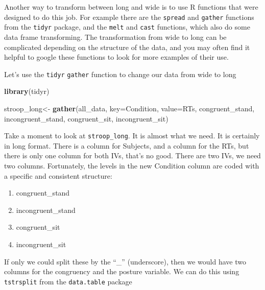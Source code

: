 \documentclass[
]{book}
\newenvironment{Shaded}{\begin{snugshade}}{\end{snugshade}}
\newcommand{\AttributeTok}[1]{\textcolor[rgb]{0.13,0.29,0.53}{#1}}
\newcommand{\FunctionTok}[1]{\textcolor[rgb]{0.13,0.29,0.53}{\textbf{#1}}}
\newcommand{\NormalTok}[1]{#1}
\newcommand{\OtherTok}[1]{\textcolor[rgb]{0.56,0.35,0.01}{#1}}
\newcommand{\SpecialCharTok}[1]{\textcolor[rgb]{0.81,0.36,0.00}{\textbf{#1}}}
\newcommand{\StringTok}[1]{\textcolor[rgb]{0.31,0.60,0.02}{#1}}
\providecommand{\tightlist}{%
  \setlength{\itemsep}{0pt}\setlength{\parskip}{0pt}}
\begin{document}
Another way to transform between long and wide is to use R functions
that were designed to do this job. For example there are the \texttt{spread}
and \texttt{gather} functions from the \texttt{tidyr} package, and the \texttt{melt} and
\texttt{cast} functions, which also do some data frame transforming. The
transformation from wide to long can be complicated depending on the
structure of the data, and you may often find it helpful to google these
functions to look for more examples of their use.

Let's use the \texttt{tidyr} \texttt{gather} function to change our data from wide to
long

\begin{Shaded}
\begin{Highlighting}[]
\FunctionTok{library}\NormalTok{(tidyr)}

\NormalTok{stroop\_long}\OtherTok{\textless{}{-}} \FunctionTok{gather}\NormalTok{(all\_data, }\AttributeTok{key=}\NormalTok{Condition, }\AttributeTok{value=}\NormalTok{RTs, }
\NormalTok{                     congruent\_stand, incongruent\_stand,}
\NormalTok{                     congruent\_sit, incongruent\_sit)}
\end{Highlighting}
\end{Shaded}

Take a moment to look at \texttt{stroop\_long}. It is almost what we need. It is
certainly in long format. There is a column for Subjects, and a column
for the RTs, but there is only one column for both IVs, that's no good.
There are two IVs, we need two columns. Fortunately, the levels in the
new Condition column are coded with a specific and consistent structure:

\begin{enumerate}
\def\labelenumi{\arabic{enumi}.}
\tightlist
\item
  congruent\_stand
\item
  incongruent\_stand
\item
  congruent\_sit
\item
  incongruent\_sit
\end{enumerate}

If only we could split these by the ``\_'' (underscore), then we would
have two columns for the congruency and the posture variable. We can do
this using \texttt{tstrsplit} from the \texttt{data.table} package

\begin{Shaded}
\end{Shaded}
\end{document}
